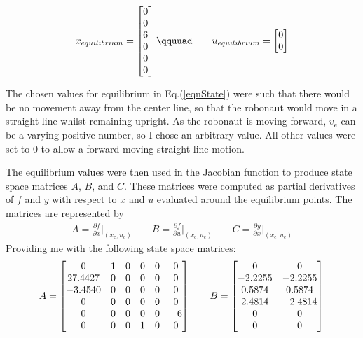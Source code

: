 \documentclass{article}
\begin{document}
\begin{equation*}
x_{equilibrium} =
\begin{bmatrix} 
0\\0\\6\\0\\0\\0
\end{bmatrix}\qquuad \qquad
u_{equilibrium} =
\begin{bmatrix}
0\\0
\end{bmatrix}
\end{equation*}
\par
The chosen values for equilibrium in Eq.(\eqref{eqnState}) were such that there would be no movement away from the center line, so that the robonaut would move in a straight line whilst remaining upright. As the robonaut is moving forward, $v_{\text{e}}$ can be a varying positive number, so I chose an arbitrary value. All other values were set to 0 to allow a forward moving straight line motion.
\par
 The equilibrium values were then used in the Jacobian function to produce state space matrices $A$, $B$, and $C$. These matrices were computed as partial derivatives of $f$ and $y$ with respect to $x$ and $u$ evaluated around the equilibrium points. The matrices are represented by
\begin{align}
A = \frac{\partial f}{\partial x}\biggr\rvert_{(x_{\text{e}}, u_{\text{e}})} \qquad
B = \frac{\partial f}{\partial u}\biggr\rvert_{(x_{\text{e}}, u_{\text{e}})}  \qquad
C = \frac{\partial y}{\partial x}\biggr\rvert_{(x_{\text{e}}, u_{\text{e}})} 
\end{align}
Providing me with the following state space matrices:
\begin{equation*}
   A = \begin{bmatrix}
    0 & 1 & 0 & 0 & 0 & 0\\
    27.4427 & 0 & 0 & 0 & 0 & 0\\
    -3.4540 & 0 & 0 & 0 & 0 & 0\\
    0 & 0 & 0 & 0 & 0 & 0\\
    0 & 0 & 0 & 0 & 0 & -6\\
    0 & 0 & 0 & 1 & 0 & 0
    \end{bmatrix} \qquad B = \begin{bmatrix}
    0 & 0\\ -2.2255 &  -2.2255\\
    0.5874  &  0.5874\\
    2.4814  & -2.4814\\ 0& 0\\ 0 & 0
    \end{bmatrix}\\ 
\end{equation*}
\end{document}
